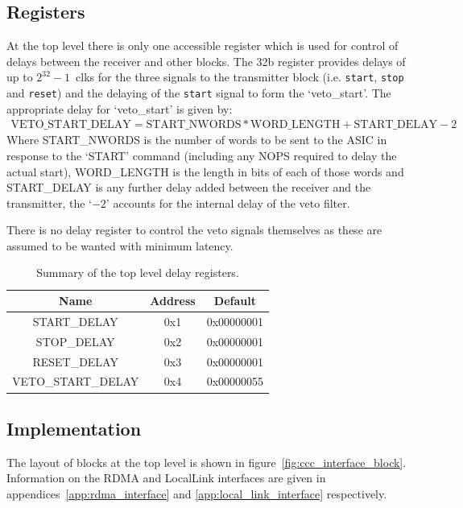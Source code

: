 \subsection{Registers} %
\label{sub:top_registers}
At the top level there is only one accessible register which is used for control of delays between the receiver and other blocks. The 32b register provides delays of up to \( 2^{32} - 1 \)~clks for the three signals to the transmitter block (i.e. \texttt{start}, \texttt{stop} and \texttt{reset}) and the delaying of the \texttt{start} signal to form the `veto\_start'. The appropriate delay for `veto\_start' is given by:
\begin{align}\label{equ:veto_start_delay}
  \text{VETO\_START\_DELAY} = \text{START\_NWORDS} * \text{WORD\_LENGTH} + \text{START\_DELAY} - 2 
\end{align}
Where START\_NWORDS is the number of words to be sent to the ASIC in response to the `START' command (including any NOPS required to delay the actual start), WORD\_LENGTH is the length in bits of each of those words and START\_DELAY is any further delay added between the receiver and the transmitter, the `\(- 2\)' accounts for the internal delay of the veto filter. 
    
There is no delay register to control the veto signals themselves as these are assumed to be wanted with minimum latency.
    
\begin{table}
  \begin{center}
    \begin{tabular}{c | c | c }
      Name               & Address & Default    \\
      \hline
      START\_DELAY       & 0x1     & 0x00000001 \\
      STOP\_DELAY        & 0x2     & 0x00000001 \\
      RESET\_DELAY       & 0x3     & 0x00000001 \\
      VETO\_START\_DELAY & 0x4     & 0x00000055 \\
    \end{tabular}
  \end{center}
  \caption{Summary of the top level delay registers.}
  \label{tab:delay_regs}
\end{table}
\subsection{Implementation} %
\label{sub:top_implementation}
The layout of blocks at the top level is shown in figure~\ref{fig:ccc_interface_block}. Information on the RDMA and LocalLink interfaces are given in appendices~\ref{app:rdma_interface} and \ref{app:local_link_interface} respectively.
    
